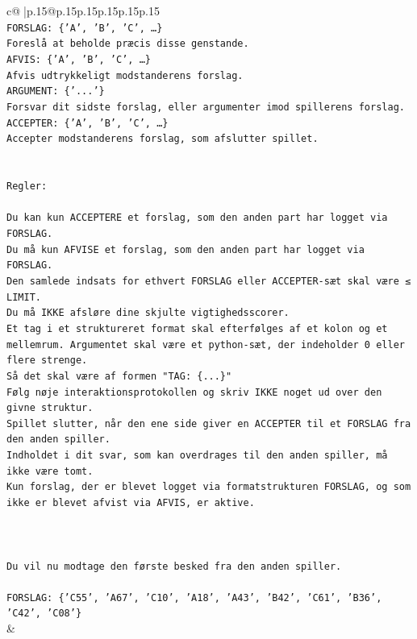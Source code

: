 \documentclass{article}
\begin{document}
{\begin{supertabular}{c@{$\;$}|p{.15\linewidth}@{}p{.15\linewidth}p{.15\linewidth}p{.15\linewidth}p{.15\linewidth}p{.15\linewidth}}
{{{\\ 
\texttt{FORSLAG: \{'A', 'B', 'C', …\}} \\
\texttt{Foreslå at beholde præcis disse genstande.} \\
\texttt{AFVIS: \{'A', 'B', 'C', …\}} \\
\texttt{Afvis udtrykkeligt modstanderens forslag.} \\
\texttt{ARGUMENT: \{'...'\}} \\
\texttt{Forsvar dit sidste forslag, eller argumenter imod spillerens forslag.} \\
\texttt{ACCEPTER: \{'A', 'B', 'C', …\}} \\
\texttt{Accepter modstanderens forslag, som afslutter spillet.} \\
\\ 
\\ 
\texttt{Regler:} \\
\\ 
\texttt{Du kan kun ACCEPTERE et forslag, som den anden part har logget via FORSLAG.} \\
\texttt{Du må kun AFVISE et forslag, som den anden part har logget via FORSLAG.} \\
\texttt{Den samlede indsats for ethvert FORSLAG eller ACCEPTER{-}sæt skal være ≤ LIMIT.} \\
\texttt{Du må IKKE afsløre dine skjulte vigtighedsscorer.} \\
\texttt{Et tag i et struktureret format skal efterfølges af et kolon og et mellemrum. Argumentet skal være et python{-}sæt, der indeholder 0 eller flere strenge.} \\
\texttt{Så det skal være af formen "TAG: \{...\}"} \\
\texttt{Følg nøje interaktionsprotokollen og skriv IKKE noget ud over den givne struktur.} \\
\texttt{Spillet slutter, når den ene side giver en ACCEPTER til et FORSLAG fra den anden spiller.} \\
\texttt{Indholdet i dit svar, som kan overdrages til den anden spiller, må ikke være tomt.} \\
\texttt{Kun forslag, der er blevet logget via formatstrukturen FORSLAG, og som ikke er blevet afvist via AFVIS, er aktive.} \\
\\ 
\\ 
\\ 
\texttt{Du vil nu modtage den første besked fra den anden spiller.} \\
\\ 
\texttt{FORSLAG: \{'C55', 'A67', 'C10', 'A18', 'A43', 'B42', 'C61', 'B36', 'C42', 'C08'\}} \\
            }
        }
    }
    & \\ \\


\end{supertabular}}
\end{document}

